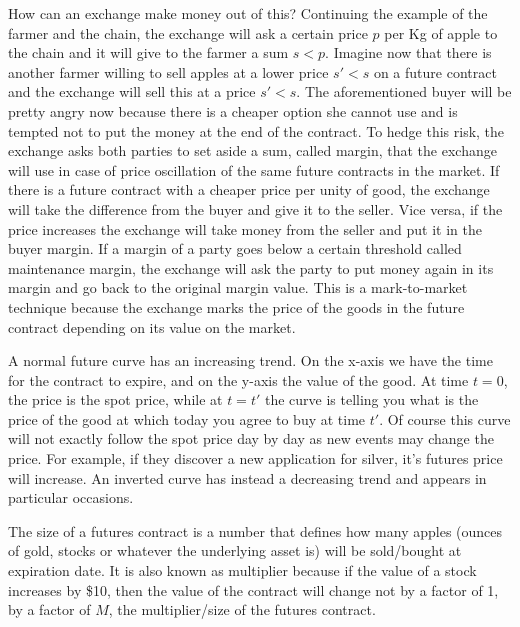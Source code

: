 How can an exchange make money out of this? Continuing the example of the farmer and the chain, the exchange will ask a certain price $p$ per Kg of apple to the chain and it will give to the farmer a sum $s < p$. Imagine now that there is another farmer willing to sell apples at a lower price $s' < s$ on a future contract and the exchange will sell this at a price $s' < s$. The aforementioned buyer will be pretty angry now because there is a cheaper option she cannot use and is tempted not to put the money at the end of the contract. To hedge this risk, the exchange asks both parties to set aside a sum, called margin, that the exchange will use in case of price oscillation of the same future contracts in the market. If there is a future contract with a cheaper price per unity of good, the exchange will take the difference from the buyer and give it to the seller. Vice versa, if the price increases the exchange will take money from the seller and put it in the buyer margin. If a margin of a party goes below a certain threshold called maintenance margin, the exchange will ask the party to put money again in its margin and go back to the original margin value. This is a mark-to-market technique because the exchange marks the price of the goods in the future contract depending on its value on the market.

A normal future curve has an increasing trend. On the x-axis we have the time for the contract to expire, and on the y-axis the value of the good. At time $t = 0$, the price is the spot price, while at $t = t'$ the curve is telling you what is the price of the good at which today you agree to buy at time $t'$. Of course this curve will not exactly follow the spot price day by day as new events may change the price. For example, if they discover a new application for silver, it's futures price will increase. An inverted curve has instead a decreasing trend and appears in particular occasions.

The size of a futures contract is a number that defines how many apples (ounces of gold, stocks or whatever the underlying asset is) will be sold/bought at expiration date. It is also known as multiplier because if the value of a stock increases by \$10, then the value of the contract will change not by a factor of 1, by a factor of $M$, the multiplier/size of the futures contract. 

